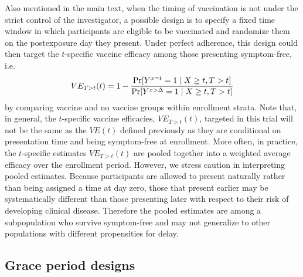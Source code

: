 \begin{appendix}
    Also mentioned in the main text, when the timing of vaccination is not under the strict control of the investigator, a possible design is to specify a fixed time window in which participants are eligible to be vaccinated and randomize them on the postexposure day they present. Under perfect adherence, this design could then target the $t$-specific vaccine efficacy among those presenting symptom-free, i.e.
    $$
    VE_{T > t}(t) = 1 - \frac{\Pr[Y^{x = t} = 1 \mid X \geq t, T > t]}{\Pr[Y^{x > \Delta} = 1 \mid X \geq t, T > t]} \\
    $$
    by comparing vaccine and no vaccine groups within enrollment  strata. Note that, in general, the $t$-specific vaccine efficacies, $VE_{T > t}(t)$, targeted in this trial will not be the same as the $VE(t)$ defined previously as they are conditional on presentation time and being symptom-free at enrollment. More often, in practice, the $t$-specific estimates $VE_{T > t}(t)$ are pooled together into a weighted average efficacy over the enrollment period. However, we stress caution in interpreting pooled estimates. Because participants are allowed to present naturally rather than being assigned a time at day zero, those that present earlier may be systematically different than those presenting later with respect to their risk of developing clinical disease. Therefore the pooled estimates are among a subpopulation who survive symptom-free and may not generalize to other populations with different propensities for delay. 

    \subsection{Grace period designs} \label{sec:graceperiod}


\end{appendix}
